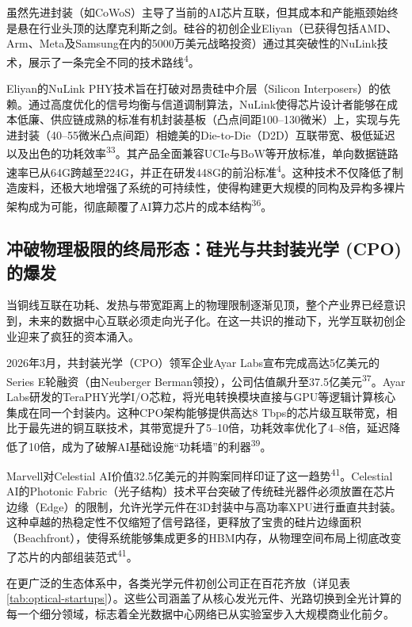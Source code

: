虽然先进封装（如CoWoS）主导了当前的AI芯片互联，但其成本和产能瓶颈始终是悬在行业头顶的达摩克利斯之剑。硅谷的初创企业Eliyan（已获得包括AMD、Arm、Meta及Samsung在内的5000万美元战略投资）通过其突破性的NuLink技术，展示了一条完全不同的技术路线\textsuperscript{4}。

Eliyan的NuLink PHY技术旨在打破对昂贵硅中介层（Silicon Interposers）的依赖。通过高度优化的信号均衡与信道调制算法，NuLink使得芯片设计者能够在成本低廉、供应链成熟的标准有机封装基板（凸点间距100--130微米）上，实现与先进封装（40--55微米凸点间距）相媲美的Die-to-Die（D2D）互联带宽、极低延迟以及出色的功耗效率\textsuperscript{33}。其产品全面兼容UCIe与BoW等开放标准，单向数据链路速率已从64G跨越至224G，并正在研发448G的前沿标准\textsuperscript{4}。这种技术不仅降低了制造废料，还极大地增强了系统的可持续性，使得构建更大规模的同构及异构多裸片架构成为可能，彻底颠覆了AI算力芯片的成本结构\textsuperscript{36}。

\subsection{冲破物理极限的终局形态：硅光与共封装光学 (CPO) 的爆发}

当铜线互联在功耗、发热与带宽距离上的物理限制逐渐见顶，整个产业界已经意识到，未来的数据中心互联必须走向光子化。在这一共识的推动下，光学互联初创企业迎来了疯狂的资本涌入。

2026年3月，共封装光学（CPO）领军企业Ayar Labs宣布完成高达5亿美元的Series E轮融资（由Neuberger Berman领投），公司估值飙升至37.5亿美元\textsuperscript{37}。Ayar Labs研发的TeraPHY光学I/O芯粒，将光电转换模块直接与GPU等逻辑计算核心集成在同一个封装内。这种CPO架构能够提供高达8 Tbps的芯片级互联带宽，相比于最先进的铜互联技术，其带宽提升了5--10倍，功耗效率优化了4--8倍，延迟降低了10倍，成为了破解AI基础设施``功耗墙''的利器\textsuperscript{39}。

Marvell对Celestial AI价值32.5亿美元的并购案同样印证了这一趋势\textsuperscript{41}。Celestial AI的Photonic Fabric（光子结构）技术平台突破了传统硅光器件必须放置在芯片边缘（Edge）的限制，允许光学元件在3D封装中与高功率XPU进行垂直共封装。这种卓越的热稳定性不仅缩短了信号路径，更释放了宝贵的硅片边缘面积（Beachfront），使得系统能够集成更多的HBM内存，从物理空间布局上彻底改变了芯片的内部组装范式\textsuperscript{41}。

在更广泛的生态体系中，各类光学元件初创公司正在百花齐放（详见表\ref{tab:optical-startups}）。这些公司涵盖了从核心发光元件、光路切换到全光计算的每一个细分领域，标志着全光数据中心网络已从实验室步入大规模商业化前夕。

